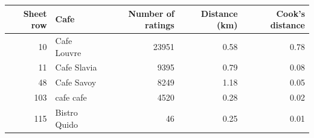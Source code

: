 \begingroup\footnotesize
\begin{tabular}{rlrrr}
  \toprule
Sheet row & Cafe & Number of ratings & Distance (km) & Cook's distance \\ 
  \midrule
 10 & Cafe Louvre & 23951 & 0.58 & 0.78 \\ 
   11 & Cafe Slavia & 9395 & 0.79 & 0.08 \\ 
   48 & Cafe Savoy & 8249 & 1.18 & 0.05 \\ 
  103 & cafe cafe & 4520 & 0.28 & 0.02 \\ 
  115 & Bistro Quido &  46 & 0.25 & 0.01 \\ 
   \bottomrule
\end{tabular}
\endgroup
